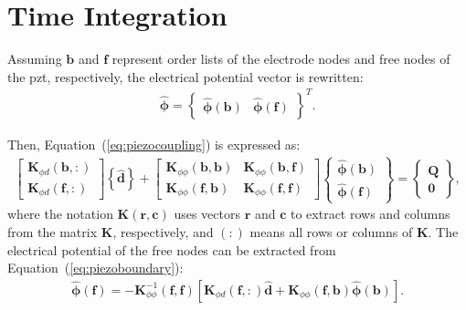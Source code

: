 \section{Time Integration}
\label{sec:time}

Assuming \(\textbf{b}\) and \(\textbf{f}\) represent order lists of the electrode nodes and free nodes of the \ac{pzt}, respectively, the electrical potential vector is rewritten:
\begin{eqnarray}
	\widehat{\boldsymbol{\phi}} = \left \{\begin{array}{cc}
		\widehat{\boldsymbol{\phi}}(\textbf{b}) &
		\widehat{\boldsymbol{\phi}}(\textbf{f})
	\end{array}\right \}^T.
	\label{eq:potential}
\end{eqnarray}

Then, Equation~(\ref{eq:piezocoupling}) is expressed as:
\begin{eqnarray}
	\left [\begin{array}{c}
		\textbf{K}_{\phi d}(\textbf{b},:) \\
		\textbf{K}_{\phi d}(\textbf{f},:)
	\end{array}\right]
	\left \{\widehat{\textbf{d}}\right\} +
	\left [\begin{array}{cc}
		\textbf{K}_{\phi \phi}(\textbf{b},\textbf{b}) & \textbf{K}_{\phi \phi}(\textbf{b},\textbf{f})\\
		\textbf{K}_{\phi \phi}(\textbf{f},\textbf{b}) & \textbf{K}_{\phi \phi}(\textbf{f},\textbf{f})
	\end{array}\right]
	\left \{\begin{array}{c}
		\widehat{\boldsymbol{\phi}}(\textbf{b}) \\
		\widehat{\boldsymbol{\phi}}(\textbf{f})
	\end{array}\right \} = 
	\left \{\begin{array}{c}
		\textbf{Q} \\
		\textbf{0}
	\end{array}\right \},
	\label{eq:piezoboundary}
\end{eqnarray} 
where the notation \(\textbf{K}(\textbf{r},\textbf{c})\) uses vectors \(\textbf{r}\) and \(\textbf{c}\) to extract rows and columns from the matrix \(\textbf{K}\), respectively, and \((:)\) means all rows or columns of \(\textbf{K}\).
The electrical potential of the free nodes can be extracted from Equation~(\ref{eq:piezoboundary}):
\begin{eqnarray}
	\widehat{\boldsymbol{\phi}}(\textbf{f}) = -\textbf{K}_{\phi\phi}^{-1}(\textbf{f},\textbf{f})\left[\textbf{K}_{\phi d}(\textbf{f},:) \widehat{\textbf{d}} + \textbf{K}_{\phi\phi}(\textbf{f},\textbf{b})\widehat{\boldsymbol{\phi}}(\textbf{b}) \right].
	\label{eq:freePotetial}
\end{eqnarray}

